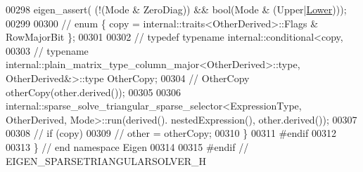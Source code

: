\begin{DoxyCode}
00298   eigen\_assert( (!(Mode & ZeroDiag)) && \textcolor{keywordtype}{bool}(Mode & (Upper|\hyperlink{group__enums_gga39e3366ff5554d731e7dc8bb642f83cda891792b8ed394f7607ab16dd716f60e6}{Lower})));
00299 
00300 \textcolor{comment}{//   enum \{ copy = internal::traits<OtherDerived>::Flags & RowMajorBit \};}
00301 
00302 \textcolor{comment}{//   typedef typename internal::conditional<copy,}
00303 \textcolor{comment}{//     typename internal::plain\_matrix\_type\_column\_major<OtherDerived>::type, OtherDerived&>::type
       OtherCopy;}
00304 \textcolor{comment}{//   OtherCopy otherCopy(other.derived());}
00305 
00306   internal::sparse\_solve\_triangular\_sparse\_selector<ExpressionType, OtherDerived, Mode>::run(derived().
      nestedExpression(), other.derived());
00307 
00308 \textcolor{comment}{//   if (copy)}
00309 \textcolor{comment}{//     other = otherCopy;}
00310 \}
00311 \textcolor{preprocessor}{#endif}
00312 
00313 \} \textcolor{comment}{// end namespace Eigen}
00314 
00315 \textcolor{preprocessor}{#endif // EIGEN\_SPARSETRIANGULARSOLVER\_H}
\end{DoxyCode}
